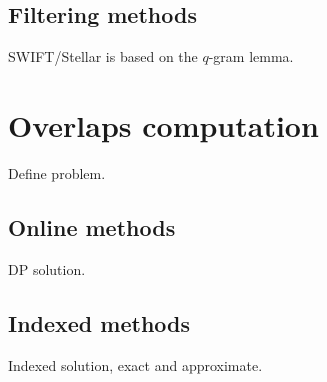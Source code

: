 \subsection{Filtering methods}
SWIFT/Stellar is based on the $q$-gram lemma.


\section{Overlaps computation}

Define problem.

\subsection{Online methods}

DP solution.

\subsection{Indexed methods}

Indexed solution, exact and approximate.
